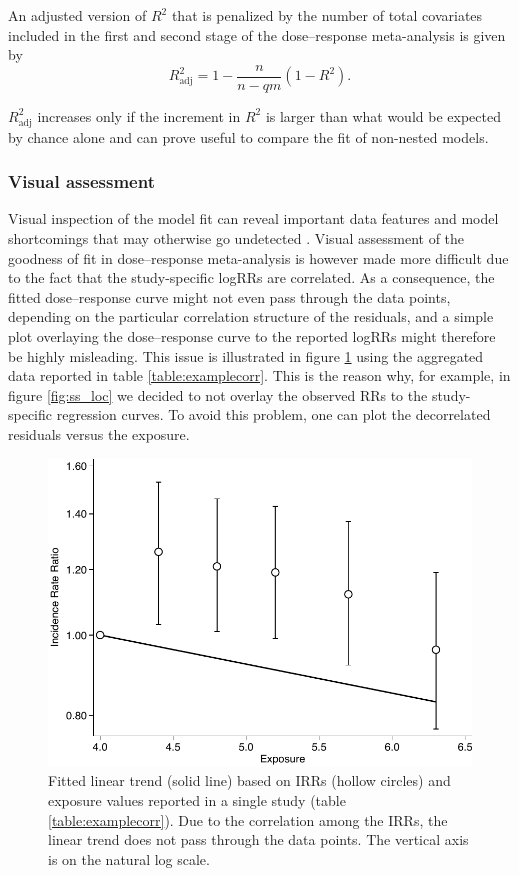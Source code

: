 An adjusted version of $R^2$ that is penalized by the number of total covariates included in the first and second stage of the dose--response meta-analysis is given by
\begin{equation*}
R_{\textrm{adj}}^2 = 1- \frac{n}{n-qm}\left(1-R^2\right).
\end{equation*}

$R_{\textrm{adj}}^2$ increases only if the increment in $R^2$ is larger than what would be expected by chance alone and can prove useful to compare the fit of non-nested models.

\subsubsection{Visual assessment}

Visual inspection of the model fit can reveal important data features and model shortcomings that may otherwise go undetected \citep{kvalseth_cautionary_1985}. Visual assessment of the goodness of fit in dose--response meta-analysis is however made more difficult due to the fact that the study-specific logRRs are correlated. As a consequence, the fitted dose--response curve might not even pass through the data points, depending on the particular correlation structure of the residuals, and a simple plot overlaying the dose--response curve to the reported logRRs might therefore be highly misleading. This issue is illustrated in figure \ref{fig:visual_wrong} using the aggregated data reported in table \ref{table:examplecorr}. This is the reason why, for example, in figure \ref{fig:ss_loc} we decided to not overlay the observed RRs to the study-specific regression curves. To avoid this problem, one can plot the decorrelated residuals versus the exposure. 

\begin{figure}[]
\centering
\includegraphics[width=.8\linewidth]{figures/visual_wrong.pdf}
\caption[Plot overlaying one study-specific dose--response curve to the reported IRRs]{Fitted linear trend (solid line) based on IRRs (hollow circles) and exposure values reported in a single study (table \ref{table:examplecorr}). Due to the correlation among the IRRs, the linear trend does not pass through the data points. The vertical axis is on the natural log scale.}
\label{fig:visual_wrong}
\end{figure}

